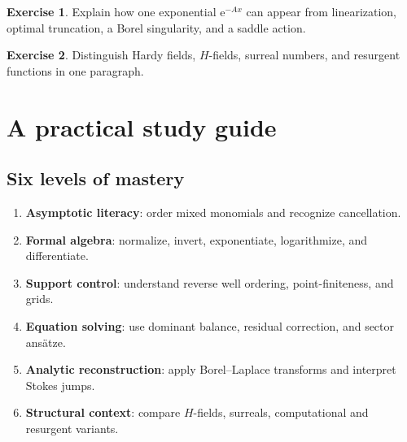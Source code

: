 \documentclass[11pt,oneside,openany]{book}
\newcommand{\e}{\mathrm{e}}
\theoremstyle{plain}
\theoremstyle{definition}
\newtheorem{exercise}{Exercise}[chapter]
\theoremstyle{remark}
\newcommand{\term}[1]{\textbf{#1}}
\begin{document}
\begin{exercise}
Explain how one exponential $\e^{-Ax}$ can appear from linearization, optimal truncation, a Borel singularity, and a saddle action.
\end{exercise}

\begin{exercise}
Distinguish Hardy fields, $H$-fields, surreal numbers, and resurgent functions in one paragraph.
\end{exercise}


\chapter{A practical study guide}
\label{ch:study-guide}

\section{Six levels of mastery}
\begin{enumerate}
  \item \term{Asymptotic literacy}: order mixed monomials and recognize cancellation.
  \item \term{Formal algebra}: normalize, invert, exponentiate, logarithmize, and differentiate.
  \item \term{Support control}: understand reverse well ordering, point-finiteness, and grids.
  \item \term{Equation solving}: use dominant balance, residual correction, and sector ansätze.
  \item \term{Analytic reconstruction}: apply Borel--Laplace transforms and interpret Stokes jumps.
  \item \term{Structural context}: compare $H$-fields, surreals, computational and resurgent variants.
\end{enumerate}
\end{document}
